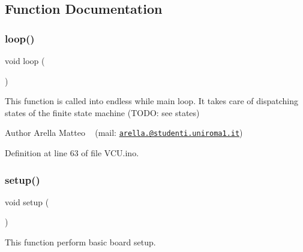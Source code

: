 \subsection{Function Documentation}
\mbox{\label{_v_c_u_8ino_afe461d27b9c48d5921c00d521181f12f}} 
\subsubsection{\texorpdfstring{loop()}{loop()}}
{\footnotesize\ttfamily void loop (\begin{DoxyParamCaption}{ }\end{DoxyParamCaption})}



This function is called into endless while main loop. It takes care of dispatching states of the finite state machine (T\+O\+DO\+: see states) 

\begin{DoxyAuthor}{Author}
Arella Matteo ~\newline
 (mail\+: \href{mailto:arella.1646983@studenti.uniroma1.it}{\tt arella.@studenti.\+uniroma1.\+it}) 
\end{DoxyAuthor}


Definition at line 63 of file V\+C\+U.\+ino.

\mbox{\label{_v_c_u_8ino_a4fc01d736fe50cf5b977f755b675f11d}} 
\subsubsection{\texorpdfstring{setup()}{setup()}}
{\footnotesize\ttfamily void setup (\begin{DoxyParamCaption}{ }\end{DoxyParamCaption})}



This function perform basic board setup. 


